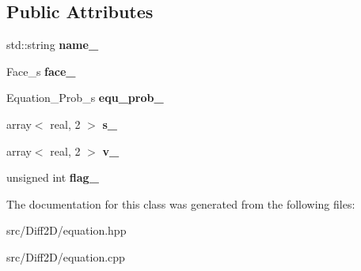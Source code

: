 \subsection*{Public Attributes}
\begin{DoxyCompactItemize}
\item 
\hypertarget{classEquation_a2bbb65c98ebf1345231370e93b504037}{std\-::string {\bfseries name\-\_\-}}\label{classEquation_a2bbb65c98ebf1345231370e93b504037}

\item 
\hypertarget{classEquation_a9eeeceed0d8130fd30fb2e65f3b15f3f}{Face\-\_\-s {\bfseries face\-\_\-}}\label{classEquation_a9eeeceed0d8130fd30fb2e65f3b15f3f}

\item 
\hypertarget{classEquation_a1ece93bf1c58eb22001327da69ab73fc}{Equation\-\_\-\-Prob\-\_\-s {\bfseries equ\-\_\-prob\-\_\-}}\label{classEquation_a1ece93bf1c58eb22001327da69ab73fc}

\item 
\hypertarget{classEquation_ac7f793f3b1e3694b719d91d884460880}{array$<$ real, 2 $>$ {\bfseries s\-\_\-}}\label{classEquation_ac7f793f3b1e3694b719d91d884460880}

\item 
\hypertarget{classEquation_aa48c28c116aec278f7713a414dec6196}{array$<$ real, 2 $>$ {\bfseries v\-\_\-}}\label{classEquation_aa48c28c116aec278f7713a414dec6196}

\item 
\hypertarget{classEquation_a1820f1ab792e83981456fce5dda492b9}{unsigned int {\bfseries flag\-\_\-}}\label{classEquation_a1820f1ab792e83981456fce5dda492b9}

\end{DoxyCompactItemize}


The documentation for this class was generated from the following files\-:\begin{DoxyCompactItemize}
\item 
src/\-Diff2\-D/equation.\-hpp\item 
src/\-Diff2\-D/equation.\-cpp\end{DoxyCompactItemize}
